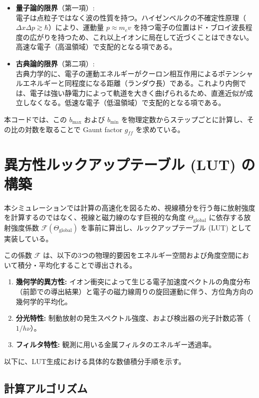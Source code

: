 \documentclass[a4paper,11pt]{bxjsarticle} %
\begin{document}
\begin{itemize}
    \item \textbf{量子論的限界}（第一項）: \\
    電子は点粒子ではなく波の性質を持つ。ハイゼンベルクの不確定性原理（$\Delta x \Delta p \gtrsim \hbar$）により、運動量 $p \approx m_e v$ を持つ電子の位置はド・ブロイ波長程度の広がりを持つため、これ以上イオンに局在して近づくことはできない。高速な電子（高温領域）で支配的となる項である。
    
    \item \textbf{古典論的限界}（第二項）: \\
    古典力学的に、電子の運動エネルギーがクーロン相互作用によるポテンシャルエネルギーと同程度になる距離（ランダウ長）である。これより内側では、電子は強い静電力によって軌道を大きく曲げられるため、直進近似が成立しなくなる。低速な電子（低温領域）で支配的となる項である。
\end{itemize}

本コードでは、この $b_{\max}$ および $b_{\min}$ を物理定数からステップごとに計算し、その比の対数を取ることで Gaunt factor $g_{ff}$ を求めている。

\section{異方性ルックアップテーブル (LUT) の構築}

本シミュレーションでは計算の高速化を図るため、視線積分を行う毎に放射強度を計算するのではなく、視線と磁力線のなす巨視的な角度 $\Theta_{\mathrm{global}}$ に依存する放射強度係数 $\mathcal{F}(\Theta_{\mathrm{global}})$ を事前に算出し、ルックアップテーブル (LUT) として実装している。

この係数 $\mathcal{F}$ は、以下の3つの物理的要因をエネルギー空間および角度空間において積分・平均化することで導出される。

\begin{enumerate}
    \item \textbf{幾何学的異方性:} イオン衝突によって生じる電子加速度ベクトルの角度分布（前節での導出結果）と電子の磁力線周りの旋回運動に伴う、方位角方向の幾何学的平均化。
    \item \textbf{分光特性:} 制動放射の発生スペクトル強度、および検出器の光子計数応答（$1/h\nu$）。
    \item \textbf{フィルタ特性:} 観測に用いる金属フィルタのエネルギー透過率。
\end{enumerate}

以下に、LUT生成における具体的な数値積分手順を示す。
\subsection{計算アルゴリズム}
\end{document}
